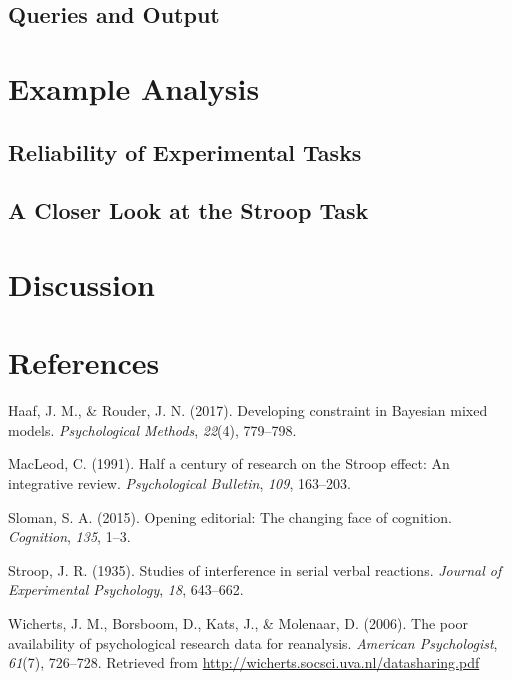 \documentclass[
  man]{apa6}
\newlength{\cslhangindent}
\newlength{\cslentryspacingunit} %
\newenvironment{CSLReferences}[2] %
 {%
  \setlength{\parindent}{0pt}
  \ifodd #1
  \let\oldpar\par
  \def\par{\hangindent=\cslhangindent\oldpar}
  \fi
  \setlength{\parskip}{#2\cslentryspacingunit}
 }%
 {}
\begin{document}
\hypertarget{queries-and-output}{%
\subsection{Queries and Output}\label{queries-and-output}}

\hypertarget{example-analysis}{%
\section{Example Analysis}\label{example-analysis}}

\hypertarget{reliability-of-experimental-tasks}{%
\subsection{Reliability of Experimental Tasks}\label{reliability-of-experimental-tasks}}

\hypertarget{a-closer-look-at-the-stroop-task}{%
\subsection{A Closer Look at the Stroop Task}\label{a-closer-look-at-the-stroop-task}}

\hypertarget{discussion}{%
\section{Discussion}\label{discussion}}

\newpage

\hypertarget{references}{%
\section{References}\label{references}}

\hypertarget{refs}{}
\begin{CSLReferences}{1}{0}
\leavevmode{}%
Haaf, J. M., \& Rouder, J. N. (2017). Developing constraint in {B}ayesian mixed models. \emph{Psychological Methods}, \emph{22}(4), 779--798.

\leavevmode{}%
MacLeod, C. (1991). Half a century of research on the {S}troop effect: {A}n integrative review. \emph{Psychological Bulletin}, \emph{109}, 163--203.

\leavevmode{}%
Sloman, S. A. (2015). Opening editorial: The changing face of cognition. \emph{Cognition}, \emph{135}, 1--3.

\leavevmode{}%
Stroop, J. R. (1935). Studies of interference in serial verbal reactions. \emph{Journal of Experimental Psychology}, \emph{18}, 643--662.

\leavevmode{}%
Wicherts, J. M., Borsboom, D., Kats, J., \& Molenaar, D. (2006). The poor availability of psychological research data for reanalysis. \emph{American Psychologist}, \emph{61}(7), 726--728. Retrieved from \url{http://wicherts.socsci.uva.nl/datasharing.pdf}

\end{CSLReferences}
\end{document}
